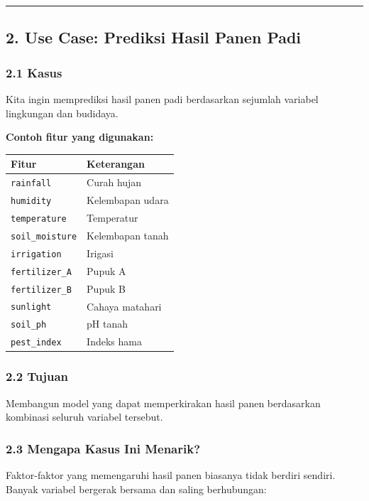 \documentclass[12pt,a4paper]{article}
\begin{document}
\hrule


\subsection{2. Use Case: Prediksi Hasil Panen Padi}

\subsubsection{2.1 Kasus}

Kita ingin memprediksi hasil panen padi berdasarkan sejumlah variabel lingkungan dan budidaya.


\textbf{Contoh fitur yang digunakan:}


\begin{tabular}{|l|l|}
\hline
Fitur & Keterangan \\
\hline
\texttt{rainfall} & Curah hujan \\
\hline
\texttt{humidity} & Kelembapan udara \\
\hline
\texttt{temperature} & Temperatur \\
\hline
\texttt{soil_moisture} & Kelembapan tanah \\
\hline
\texttt{irrigation} & Irigasi \\
\hline
\texttt{fertilizer_A} & Pupuk A \\
\hline
\texttt{fertilizer_B} & Pupuk B \\
\hline
\texttt{sunlight} & Cahaya matahari \\
\hline
\texttt{soil_ph} & pH tanah \\
\hline
\texttt{pest_index} & Indeks hama \\
\hline
\end{tabular}


\subsubsection{2.2 Tujuan}

Membangun model yang dapat memperkirakan hasil panen berdasarkan kombinasi seluruh variabel tersebut.


\subsubsection{2.3 Mengapa Kasus Ini Menarik?}

Faktor-faktor yang memengaruhi hasil panen biasanya tidak berdiri sendiri. Banyak variabel bergerak bersama dan saling berhubungan:
\end{document}
